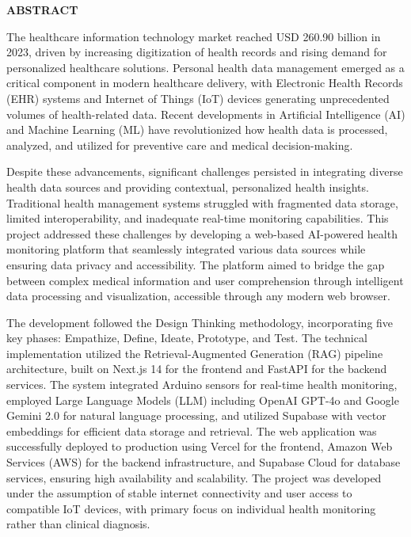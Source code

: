 \documentclass[12pt]{report}
\begin{document}
\thispagestyle{empty}
{\centering\fontsize{16}{19}\bfseries ABSTRACT\par}
\vspace{1cm}

The healthcare information technology market reached USD 260.90 billion in 2023, driven by increasing digitization of health records and rising demand for personalized healthcare solutions. Personal health data management emerged as a critical component in modern healthcare delivery, with Electronic Health Records (EHR) systems and Internet of Things (IoT) devices generating unprecedented volumes of health-related data. Recent developments in Artificial Intelligence (AI) and Machine Learning (ML) have revolutionized how health data is processed, analyzed, and utilized for preventive care and medical decision-making.

Despite these advancements, significant challenges persisted in integrating diverse health data sources and providing contextual, personalized health insights. Traditional health management systems struggled with fragmented data storage, limited interoperability, and inadequate real-time monitoring capabilities. This project addressed these challenges by developing a web-based AI-powered health monitoring platform that seamlessly integrated various data sources while ensuring data privacy and accessibility. The platform aimed to bridge the gap between complex medical information and user comprehension through intelligent data processing and visualization, accessible through any modern web browser.

The development followed the Design Thinking methodology, incorporating five key phases: Empathize, Define, Ideate, Prototype, and Test. The technical implementation utilized the Retrieval-Augmented Generation (RAG) pipeline architecture, built on Next.js 14 for the frontend and FastAPI for the backend services. The system integrated Arduino sensors for real-time health monitoring, employed Large Language Models (LLM) including OpenAI GPT-4o and Google Gemini 2.0 for natural language processing, and utilized Supabase with vector embeddings for efficient data storage and retrieval. The web application was successfully deployed to production using Vercel for the frontend, Amazon Web Services (AWS) for the backend infrastructure, and Supabase Cloud for database services, ensuring high availability and scalability. The project was developed under the assumption of stable internet connectivity and user access to compatible IoT devices, with primary focus on individual health monitoring rather than clinical diagnosis.
\clearpage
\end{document}
